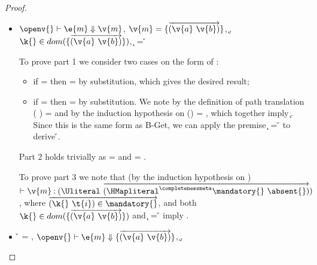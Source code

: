 \begin{lemma}
\begin{proof}
\begin{case}[T-GetHMap]
  \begin{itemize}
    \item[]
      \begin{subcase}[B-Get]
      $\opsem {\openv{}} {\e{m}}{\v{m}}$,
        $\v{m} = {\curlymap{\overrightarrow{({\v{a}}\ {\v{b}})}}}$,
         \opsem {\openv{}} {} {\k{}},
         $\keyinmap{\k{}}{\curlymap{\overrightarrow{({\v{a}}\ {\v{b}})}}}$,
          {\k{}} = {\v{}}

         To prove part 1 we consider two cases on the form of : 
         \begin{itemize}
           \item
         if {} = \emptyobject{}
         then \object{} = \emptyobject{} by substitution, which gives the desired result;
           \item
         if  = { {}}
         then \object{} = { {}} by substitution.
         We note by the definition of path translation
         {\openv{}}({ {}}) =
         {}
         and by the induction hypothesis on 
         {{\openv{}}()} = {},
         which together imply 
         \inopenv {\openv{}} {\object{}} { {\k{}}}.
         Since this is the same form as B-Get, we can apply the premise
          {\k{}} = {\v{}}
         to derive \inopenv {\openv{}} {\object{}} {\v{}}.
         \end{itemize}
         
         Part 2 holds trivially as \thenprop{\prop{}} = {\topprop{}}
         and \elseprop{\prop{}} = {\topprop{}}.

         To prove part 3 we note that (by the induction hypothesis on )
         $\judgementtwo{}{\hastype{\v{m}}{\Unionsplice{\overrightarrow {\HMapgeneric {\mandatory{}} {\absent{}}}}}}$,
         where $\overrightarrow{\inmandatory{\k{}}{\t{i}}{\mandatory{}}}$, and 
         both
         $\keyinmap{\k{}}{\curlymap{\overrightarrow{({\v{a}}\ {\v{b}})}}}$
         and
          {\k{}} = {\v{}}
         imply .

      \end{subcase}
    \item[]
      \begin{subcase}[B-GetMissing]
        \v{} = \nil,
        $\opsem {\openv{}}
        {\e{m}} {\curlymap{\overrightarrow{({\v{a}}\ {\v{b}})}}}$,
       \opsem {\openv{}} {} {\k{}},


\end{subcase}
\end{itemize}
\end{case}
\end{proof}
\end{lemma}
